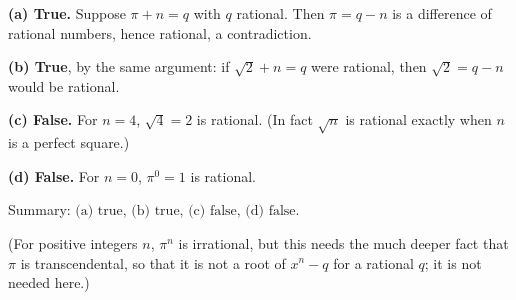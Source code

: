 \textbf{(a) True.} Suppose $\pi+n=q$ with $q$ rational. Then $\pi=q-n$ is a difference of rational numbers, hence rational, a contradiction.

\textbf{(b) True}, by the same argument: if $\sqrt2+n=q$ were rational, then $\sqrt2=q-n$ would be rational.

\textbf{(c) False.} For $n=4$, $\sqrt4=2$ is rational. (In fact $\sqrt n$ is rational exactly when $n$ is a perfect square.)

\textbf{(d) False.} For $n=0$, $\pi^0=1$ is rational.

Summary: $\boxed{\text{(a) true, (b) true, (c) false, (d) false}}$.

(For positive integers $n$, $\pi^n$ is irrational, but this needs the much deeper fact that $\pi$ is transcendental, so that it is not a root of $x^n-q$ for a rational $q$; it is not needed here.)
